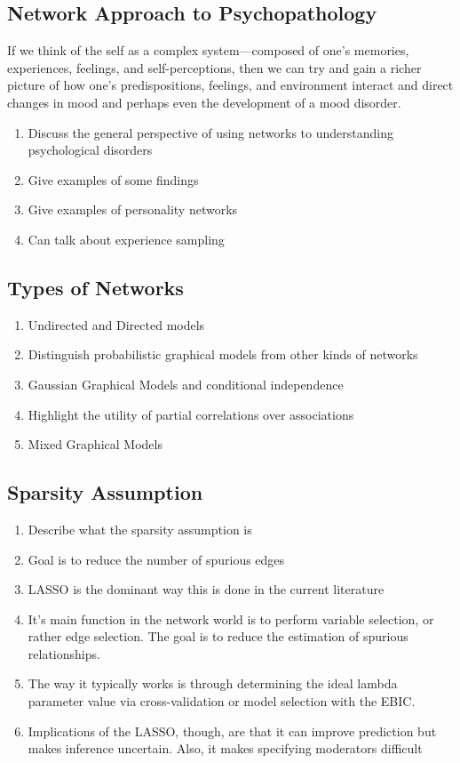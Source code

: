\subsection{Network Approach to Psychopathology}
If we think of the self as a complex system---composed of one's memories, experiences, feelings, and self-perceptions, then we can try and gain a richer picture of how one's predispositions, feelings, and environment interact and direct changes in mood and perhaps even the development of a mood disorder.
\begin{enumerate}
    \item Discuss the general perspective of using networks to understanding psychological disorders
    \item Give examples of some findings
    \item Give examples of personality networks 
    \item Can talk about experience sampling
\end{enumerate}
\subsection{Types of Networks}
\begin{enumerate}
    \item Undirected and Directed models
    \item Distinguish probabilistic graphical models from other kinds of networks
    \item Gaussian Graphical Models and conditional independence
    \item Highlight the utility of partial correlations over associations
    \item Mixed Graphical Models
\end{enumerate}
\subsection{Sparsity Assumption}
\begin{enumerate}
    \item Describe what the sparsity assumption is
    \item Goal is to reduce the number of spurious edges
    \item LASSO is the dominant way this is done in the current literature
    \item It's main function in the network world is to perform variable selection, or rather edge selection. The goal is to reduce the estimation of spurious relationships.
    \item The way it typically works is through determining the ideal lambda parameter value via cross-validation or model selection with the EBIC. 
    \item Implications of the LASSO, though, are that it can improve prediction but makes inference uncertain. Also, it makes specifying moderators difficult
\end{enumerate}

